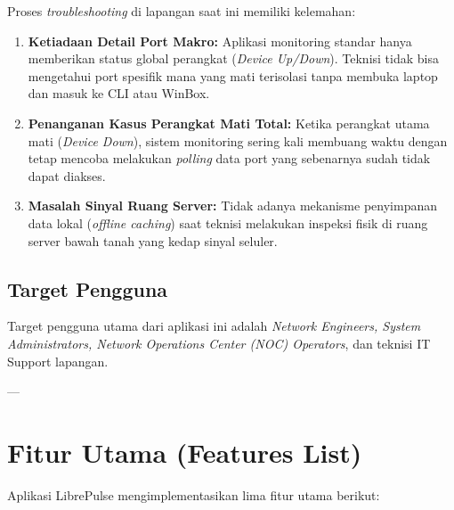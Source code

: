 \documentclass[12pt,titlepage]{article}
\begin{document}
Proses \textit{troubleshooting} di lapangan saat ini memiliki kelemahan:
\begin{enumerate}
    \item \textbf{Ketiadaan Detail Port Makro:} Aplikasi monitoring standar hanya memberikan status global perangkat (\textit{Device Up/Down}). Teknisi tidak bisa mengetahui port spesifik mana yang mati terisolasi tanpa membuka laptop dan masuk ke CLI atau WinBox.
    \item \textbf{Penanganan Kasus Perangkat Mati Total:} Ketika perangkat utama mati (\textit{Device Down}), sistem monitoring sering kali membuang waktu dengan tetap mencoba melakukan \textit{polling} data port yang sebenarnya sudah tidak dapat diakses.
    \item \textbf{Masalah Sinyal Ruang Server:} Tidak adanya mekanisme penyimpanan data lokal (\textit{offline caching}) saat teknisi melakukan inspeksi fisik di ruang server bawah tanah yang kedap sinyal seluler.
\end{enumerate}

\subsection{Target Pengguna}
Target pengguna utama dari aplikasi ini adalah \textit{Network Engineers, System Administrators, Network Operations Center (NOC) Operators}, dan teknisi IT Support lapangan.

---

\section{Fitur Utama (Features List)}

Aplikasi LibrePulse mengimplementasikan lima fitur utama berikut:
\end{document}
